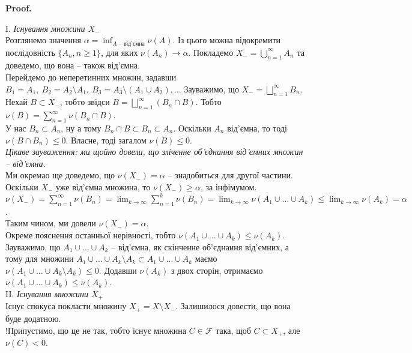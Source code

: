 \documentclass[a4paper, 10pt]{article}
\makeatletter
\theoremstyle{theoremdd}
\renewenvironment{proof}[1][Proof.\\]{\par
\pushQED{\hfill \qed}%
\normalfont \topsep6\p@\@plus6\p@\relax
\trivlist
\item\relax
{\bfseries
#1\@addpunct{.}}\hspace\labelsep\ignorespaces
}{%
\popQED\endtrivlist\@endpefalse
}
\makeatother
\begin{document}
\begin{proof}
I. \textit{Існування множини $X_-$}\\
Розглянемо значення $\alpha = \displaystyle\inf_{A \text{ -- від'ємна}} \nu(A)$. Із цього можна відокремити послідовність $\{A_n, n \geq 1\}$, для яких $\nu(A_n) \to \alpha$. Покладемо $X_- = \displaystyle\bigcup_{n=1}^\infty A_n$ та доведемо, що вона -- також від'ємна.\\
Перейдемо до неперетинних множин, задавши $B_1 = A_1,\ B_2 = A_2 \setminus A_1,\ B_3 = A_3 \setminus (A_1 \cup A_2), \dots$ Зауважимо, що $X_- = \displaystyle\bigsqcup_{n=1}^\infty B_n$.\\
Нехай $B \subset X_-$, тобто звідси $B = \displaystyle\bigsqcup_{n=1}^\infty (B_n \cap B)$. Тобто $\nu(B) = \displaystyle\sum_{n=1}^\infty \nu(B_n \cap B)$.\\
У нас $B_n \subset A_n$, ну а тому $B_n \cap B \subset B_n \subset A_n$. Оскільки $A_n$ від'ємна, то тоді $\nu(B \cap B_n) \leq 0$. Власне, тоді загалом $\nu(B) \leq 0$.\\
\textit{Цікаве зауваження: ми щойно довели, що зліченне об'єднання від'ємних множин -- від'ємна.}\\
Ми окремао ще доведемо, що $\nu(X_-) = \alpha$ -- знадобиться для другої частини.\\
Оскільки $X_-$ уже від'ємна множина, то $\nu(X_-) \geq \alpha$, за інфімумом.\\
$\nu(X_-) = \displaystyle\sum_{n=1}^\infty \nu(B_n) = \lim_{k \to \infty} \sum_{n=1}^k \nu(B_n) = \lim_{k \to \infty} \nu\left( A_1 \cup \dots \cup A_k\right) \leq \lim_{k \to \infty} \nu(A_k) = \alpha$.\\
Таким чином, ми довели $\nu(X_-) = \alpha$.\\
Окреме пояснення останньої нерівності, тобто $\nu(A_1 \cup \dots \cup A_{k}) \leq \nu(A_k)$.\\
Зауважимо, що $A_1 \cup \dots \cup A_k$ -- від'ємна, як скінченне об'єднання від'ємних, а тому для множини $A_1 \cup \dots \cup A_k \setminus A_k \subset A_1 \cup \dots \cup A_k$ маємо $\nu(A_1 \cup \dots \cup A_k \setminus A_k) \leq 0$. Додавши $\nu(A_k)$ з двох сторін, отримаємо $\nu(A_1 \cup \dots \cup A_k) \leq \nu(A_k)$.
\bigskip \\
II. \textit{Існування множини $X_+$}\\
Існує спокуса покласти множину $X_+ = X \setminus X_-$. Залишилося довести, що вона буде додатною.\\
!Припустимо, що це не так, тобто існує множина $C \in \mathcal{F}$ така, щоб $C \subset X_+$, але $\nu(C) < 0$. \\

\end{proof}
\end{document}
